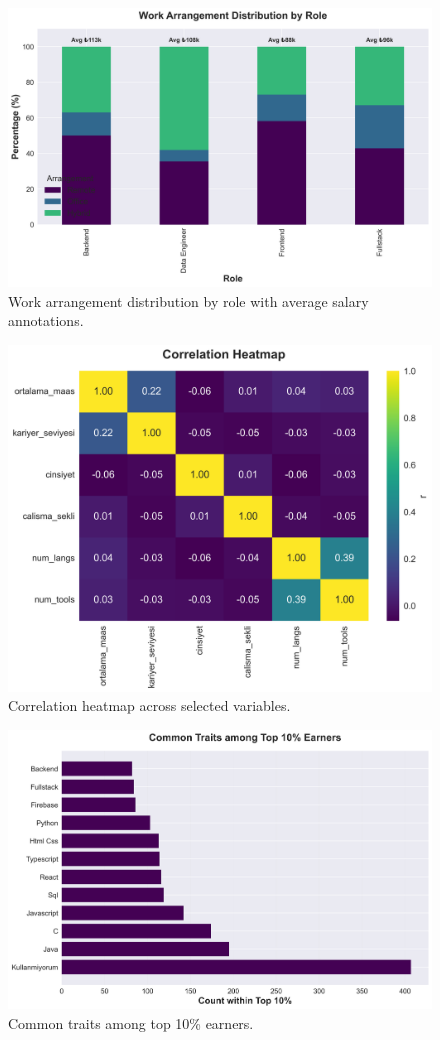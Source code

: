 \begin{figure}[H]
  \centering
  \includegraphics[width=0.85\linewidth]{figures/26_work_arrangement_by_role.png}
  \caption{Work arrangement distribution by role with average salary annotations.}
  \label{fig:work-arrangement-role}
\end{figure}

\begin{figure}[H]
  \centering
  \includegraphics[width=0.85\linewidth]{figures/27_correlation_heatmap.png}
  \caption{Correlation heatmap across selected variables.}
  \label{fig:corr-heatmap}
\end{figure}

\begin{figure}[H]
  \centering
  \includegraphics[width=0.85\linewidth]{figures/28_top_earners_traits.png}
  \caption{Common traits among top 10\% earners.}
  \label{fig:top-earners}
\end{figure}
